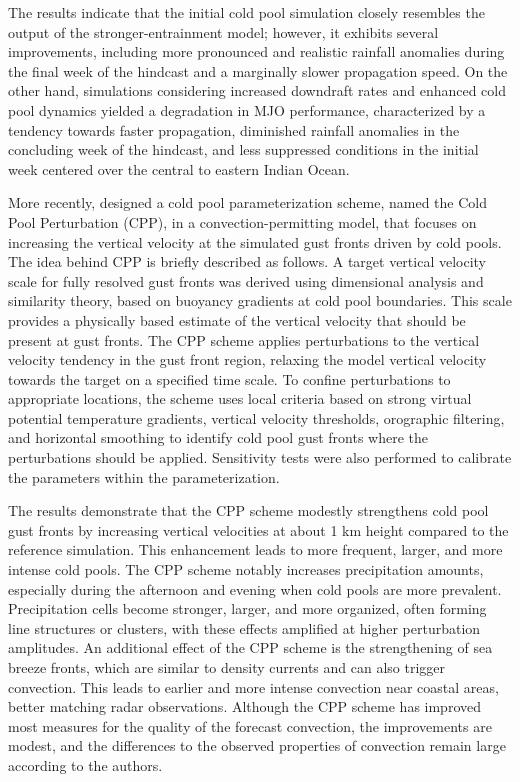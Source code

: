 The results indicate that the initial cold pool simulation closely resembles the output of the stronger-entrainment model; however, it exhibits several improvements, including more pronounced and realistic rainfall anomalies during the final week of the hindcast and a marginally slower propagation speed. On the other hand, simulations considering increased downdraft rates and enhanced cold pool dynamics yielded a degradation in MJO performance, characterized by a tendency towards faster propagation, diminished rainfall anomalies in the concluding week of the hindcast, and less suppressed conditions in the initial week centered over the central to eastern Indian Ocean.

More recently,  designed a cold pool parameterization scheme, named the Cold Pool Perturbation (CPP), in a convection-permitting model, that focuses on increasing the vertical velocity at the simulated gust fronts driven by cold pools. The idea behind CPP is briefly described as follows. A target vertical velocity scale for fully resolved gust fronts was derived using dimensional analysis and similarity theory, based on buoyancy gradients at cold pool boundaries. This scale provides a physically based estimate of the vertical velocity that should be present at gust fronts. The CPP scheme applies perturbations to the vertical velocity tendency in the gust front region, relaxing the model vertical velocity towards the target on a specified time scale. To confine perturbations to appropriate locations, the scheme uses local criteria based on strong virtual potential temperature gradients, vertical velocity thresholds, orographic filtering, and horizontal smoothing to identify cold pool gust fronts where the perturbations should be applied. Sensitivity tests were also performed to calibrate the parameters within the parameterization.

The results demonstrate that the CPP scheme modestly strengthens cold pool gust fronts by increasing vertical velocities at about 1 km height compared to the reference simulation. This enhancement leads to more frequent, larger, and more intense cold pools. The CPP scheme notably increases precipitation amounts, especially during the afternoon and evening when cold pools are more prevalent. Precipitation cells become stronger, larger, and more organized, often forming line structures or clusters, with these effects amplified at higher perturbation amplitudes. An additional effect of the CPP scheme is the strengthening of sea breeze fronts, which are similar to density currents and can also trigger convection. This leads to earlier and more intense convection near coastal areas, better matching radar observations. Although the CPP scheme has improved most measures for the quality of the forecast convection, the improvements are modest, and the differences to the observed properties of convection remain large according to the authors.

